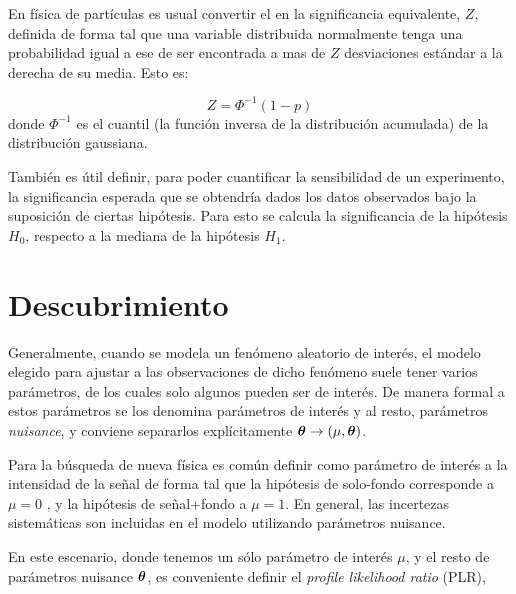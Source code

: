 En física de partículas es usual convertir el {\pvalue} en la significancia
equivalente, $Z$, definida de forma tal que una variable distribuida normalmente
tenga una probabilidad igual a ese {\pvalue} de ser encontrada a mas de $Z$
desviaciones estándar a la derecha de su media. Esto es:

\begin{equation}
  Z = \Phi^{-1}(1-p)
\end{equation}
%
donde $\Phi^{-1}$ es el cuantil (la función inversa de la distribución
acumulada) de la distribución gaussiana.

También es útil definir, para poder cuantificar la sensibilidad de un experimento,
la significancia esperada que se obtendría dados los datos observados bajo la
suposición de ciertas hipótesis.
Para esto se calcula la significancia de la hipótesis $H_0$, respecto
a la mediana de la hipótesis $H_1$.


\section{Descubrimiento}


Generalmente, cuando se modela un fenómeno aleatorio de interés, el modelo
elegido para ajustar a las observaciones de dicho fenómeno suele tener varios
parámetros, de los cuales solo algunos pueden ser de interés. De manera formal a
estos parámetros se los denomina parámetros de interés y al resto, parámetros
\emph{nuisance}, y conviene separarlos explícitamente $\bm{\theta} \rightarrow (\mu, \bm{\theta})$.

Para la búsqueda de nueva física es común definir como parámetro de interés a la
intensidad de la señal de forma tal que la hipótesis de solo-fondo corresponde a
$\mu = 0$ , y la hipótesis de señal+fondo a $\mu = 1$.
En general, las incertezas sistemáticas son incluidas en el modelo
utilizando parámetros nuisance.

En este escenario, donde tenemos un sólo parámetro de interés
$\mu$, y el resto de parámetros nuisance $\bm{\theta}$, es conveniente
definir el \emph{profile likelihood ratio} (PLR),

